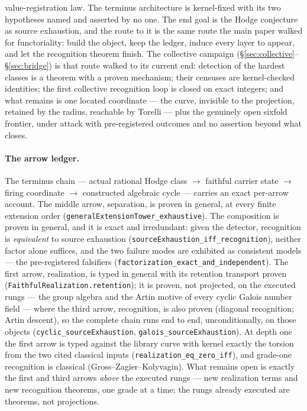 \documentclass[11pt]{article}
\theoremstyle{definition}
\theoremstyle{remark}
\begin{document}
value-registration law. The terminus architecture is kernel-fixed with its two
hypotheses named and asserted by no one. The end goal is the Hodge conjecture
as source exhaustion, and the route to it is the same route the main paper
walked for functoriality: build the object, keep the ledger, induce every
layer to appear, and let the recognition theorem finish. The collective
campaign (\S\ref{sec:collective}--\S\ref{sec:bridge}) is that route walked
to its current end: detection of the hardest classes is a theorem with a
proven mechanism; their censuses are kernel-checked identities; the first
collective recognition loop is closed on exact integers; and what remains
is one located coordinate --- the curve, invisible to the projection,
retained by the radius, reachable by Torelli --- plus the genuinely open
sixfold frontier, under attack with pre-registered outcomes and no
assertion beyond what closes.

\paragraph{The arrow ledger.} The terminus chain --- actual rational Hodge
class $\to$ faithful carrier state $\to$ firing coordinate $\to$ constructed
algebraic cycle --- carries an exact per-arrow account. The middle arrow,
separation, is proven in general, at every finite extension order
(\texttt{generalExtensionTower\_exhaustive}). The composition is proven in
general, and it is exact and irredundant: given the detector, recognition is
\emph{equivalent} to source exhaustion
(\texttt{sourceExhaustion\_iff\_recognition}), neither factor alone suffices,
and the two failure modes are exhibited as consistent models --- the
pre-registered falsifiers (\texttt{factorization\_exact\_and\_independent}).
The first arrow, realization, is typed in general with its retention
transport proven (\texttt{FaithfulRealization.retention}); it is proven, not
projected, on the executed rungs --- the group algebra and the Artin motive
of every cyclic Galois number field --- where the third arrow, recognition,
is also proven (diagonal recognition; Artin descent), so the complete chain
runs end to end, unconditionally, on those objects
(\texttt{cyclic\_sourceExhaustion}, \texttt{galois\_sourceExhaustion}). At
depth one the first arrow is typed against the library curve with kernel
exactly the torsion from the two cited classical inputs
(\texttt{realization\_eq\_zero\_iff}), and grade-one recognition is classical
(Gross--Zagier--Kolyvagin). What remains open is exactly the first and third
arrows \emph{above} the executed rungs --- new realization terms and new
recognition theorems, one grade at a time; the rungs already executed are
theorems, not projections.
\end{document}
